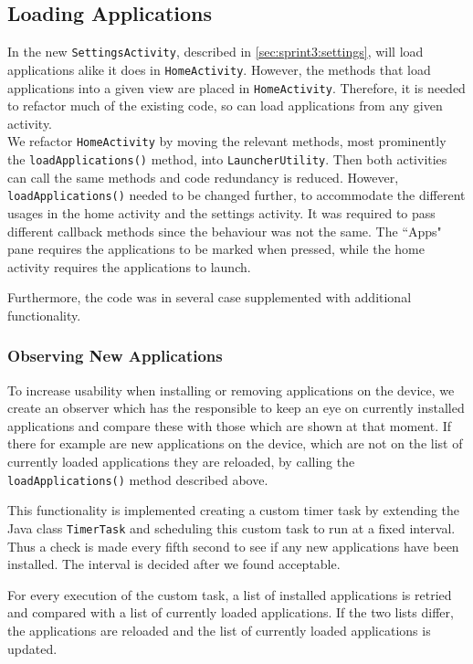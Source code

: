 \subsection{Loading Applications}\label{sect:sprint3:refactoring}
In the new \lstinline!SettingsActivity!, described in \cref{sec:sprint3:settings}, \launcher will load applications alike it does in \lstinline|HomeActivity|.
However, the methods that load applications into a given view are placed in \lstinline!HomeActivity!.
Therefore, it is needed to refactor much of the existing code, so \launcher can load applications from any given activity.\\

We refactor \lstinline!HomeActivity! by moving the relevant methods, most prominently the \lstinline|loadApplications()| method, into \lstinline!LauncherUtility!.
Then both activities can call the same methods and code redundancy is reduced. 
However, \lstinline|loadApplications()| needed to be changed further, to accommodate the different usages in the home activity and the settings activity. It was required to pass different callback methods since the behaviour was not the same. The ``Apps" pane requires the applications to be marked when pressed, while the home activity requires the applications to launch.

Furthermore, the code was in several case supplemented with additional functionality.

\subsubsection{Observing New Applications}\label{sec:sprint3:observing}
To increase usability when installing or removing applications on the device, we create an observer which has the responsible to keep an eye on currently installed applications and compare these with those which are shown at that moment. 
If there for example are new applications on the device, which are not on the list of currently loaded applications they are reloaded, by calling the \lstinline|loadApplications()| method described above.

This functionality is implemented creating a custom timer task by extending the Java class \lstinline!TimerTask! and scheduling this custom task to run at a fixed interval. 
Thus a check is made every fifth second to see if any new applications have been installed.
The interval is decided after we found acceptable.

For every execution of the custom task, a list of installed applications is retried and compared with a list of currently loaded applications. 
If the two lists differ, the applications are reloaded and the list of currently loaded applications is updated.